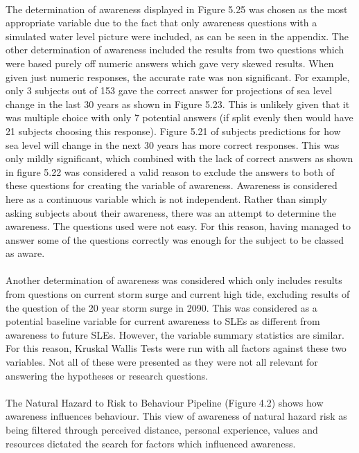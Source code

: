 \paragraph{}
The determination of awareness displayed in Figure 5.25 was chosen as the most appropriate variable due to the fact that only awareness questions with a simulated water level picture were included, as can be seen in the appendix. The other determination of awareness included the results from two questions which were based purely off numeric answers which gave very skewed results. When given just numeric responses, the accurate rate was non significant. For example, only 3 subjects out of 153 gave the correct answer for projections of sea level change in the last 30 years as shown in Figure 5.23.  This is unlikely given that it was multiple choice with only 7 potential answers (if split evenly then would have 21 subjects choosing this response). Figure 5.21 of subjects predictions for how sea level will change in the next 30 years has more correct responses. This was only mildly significant, which combined with the lack of correct answers as shown in figure 5.22 was considered a valid reason to exclude the answers to both of these questions for creating the variable of awareness. Awareness is considered here as a continuous variable which is not independent. Rather than simply asking subjects about their awareness, there was an attempt to determine the awareness. The questions used were not easy. For this reason, having managed to answer some of the questions correctly was enough for the subject to be classed as aware.

\paragraph{}
Another determination of awareness was considered which only includes results from questions on current storm surge and current high tide, excluding results of the question of the 20 year storm surge in 2090. This was considered as a potential baseline variable for current awareness to SLEs as different from awareness to future SLEs. However, the variable summary statistics are similar. For this reason, Kruskal Wallis Tests were run with all factors against these two variables. Not all of these were presented as they were not all relevant for answering the hypotheses or research questions. 

\paragraph{}
The Natural Hazard to Risk to Behaviour Pipeline (Figure 4.2) shows how awareness influences behaviour. This view of awareness of natural hazard risk as being filtered through perceived distance, personal experience, values and resources dictated the search for factors which influenced awareness. 



